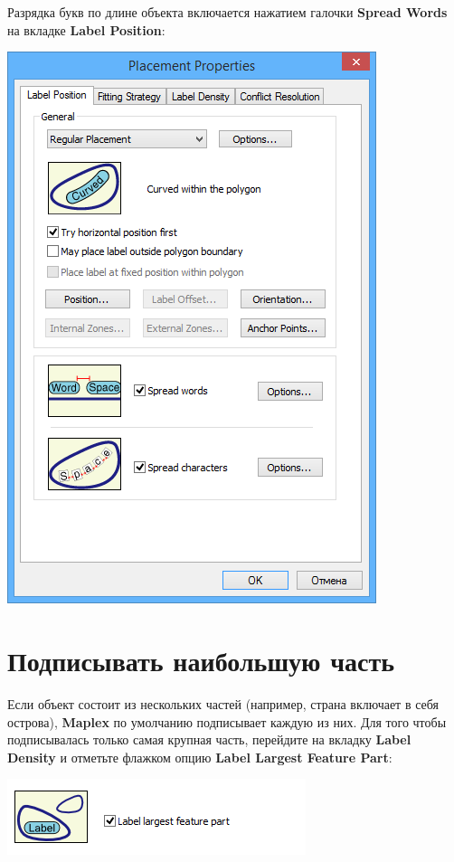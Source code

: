 \documentclass[12pt,]{book}
\begin{document}
Разрядка букв по длине объекта включается нажатием галочки \textbf{Spread Words} на вкладке \textbf{Label Position}:

\includegraphics{images/Appendix/image47.png}

\hypertarget{section-31}{%
\section{Подписывать наибольшую часть}\label{section-31}}

Если объект состоит из нескольких частей (например, страна включает в себя острова), \textbf{Maplex} по умолчанию подписывает каждую из них. Для того чтобы подписывалась только самая крупная часть, перейдите на вкладку \textbf{Label Density} и отметьте флажком опцию \textbf{Label Largest Feature Part}:

\includegraphics{images/Appendix/image48.png}
\end{document}
